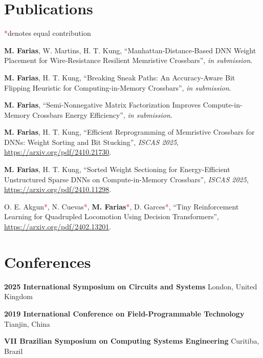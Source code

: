 \documentclass[letterpaper,10pt]{article}
\newcommand{\co}{\textcolor{crimson}{*}}
\begin{document}
\section{Publications}
\co denotes equal contribution
\vspace*{.1cm}
\begin{etaremune}
	\renewcommand{\labelenumi}{[\theenumi]}
    \item \textbf{M. Farias}, W. Martins, H. T. Kung, ``Manhattan‑Distance‑Based DNN Weight Placement for Wire‑Resistance Resilient Memristive Crossbars'', \textit{in submission}.
	\item \textbf{M. Farias}, H. T. Kung, ``Breaking Sneak Paths: An Accuracy-Aware Bit Flipping Heuristic for Computing-in-Memory Crossbars'', \textit{in submission}.
	\item \textbf{M. Farias}, ``Semi-Nonnegative Matrix Factorization Improves Compute-in-Memory Crossbars Energy Efficiency'', \textit{in submission}.
	\item \textbf{M. Farias}, H. T. Kung, ``Efficient Reprogramming of Memristive Crossbars for DNNs: Weight Sorting and Bit Stucking'', \textit{ISCAS 2025}, \href{https://arxiv.org/pdf/2410.21730}{https://arxiv.org/pdf/2410.21730}.
    \item \textbf{M. Farias}, H. T. Kung, ``Sorted Weight Sectioning for Energy-Efficient Unstructured Sparse DNNs on Compute-in-Memory Crossbars'', \textit{ISCAS 2025}, \href{https://arxiv.org/pdf/2410.11298}{https://arxiv.org/pdf/2410.11298}.
	\item O. E. Akgun\co, N. Cuevas\co, \textbf{M. Farias}\co, D. Garces\co, ``Tiny Reinforcement Learning for Quadrupled Locomotion Using Decision Transformers'', \href{https://arxiv.org/pdf/2402.13201}{https://arxiv.org/pdf/2402.13201}.
\end{etaremune}
\vspace*{-.25cm}

\section{Conferences}
\vspace*{.1cm}
\begin{etaremune}
	\item \textbf{2025 International Symposium on Circuits and Systems}
	\hfill{London, United Kingdom}
	\item \textbf{2019 International Conference on Field-Programmable Technology}
	\hfill{Tianjin, China}
	\item \textbf{VII Brazilian Symposium on Computing Systems Engineering}
	\hfill{Curitiba, Brazil}
	\end{etaremune}
\end{document}
